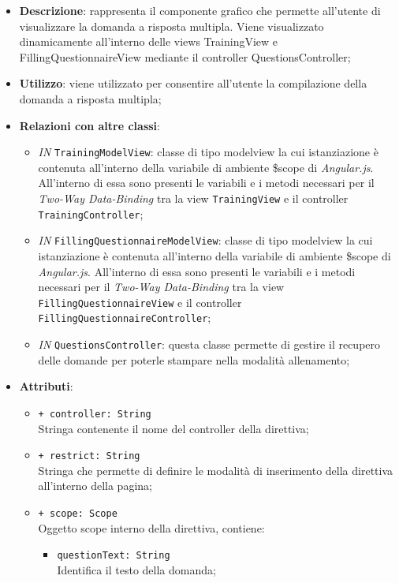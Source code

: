 		\begin{itemize}
			\item \textbf{Descrizione}: rappresenta il componente grafico che permette all'utente di visualizzare la domanda a risposta multipla. Viene visualizzato dinamicamente all'interno delle views TrainingView e FillingQuestionnaireView mediante il controller QuestionsController;
			\item \textbf{Utilizzo}: viene utilizzato per consentire all'utente la compilazione della domanda a risposta multipla;
			\item \textbf{Relazioni con altre classi}: 
			\begin{itemize}
				\item \textit{IN} \texttt{TrainingModelView}: classe di tipo modelview la cui istanziazione è contenuta all'interno della variabile di ambiente \$scope di \textit{Angular.js}. All'interno di essa sono presenti le variabili e i metodi necessari per il \textit{Two-Way Data-Binding} tra la view \texttt{TrainingView} e il controller \texttt{TrainingController}; 
				\item \textit{IN} \texttt{FillingQuestionnaireModelView}: classe di tipo modelview la cui istanziazione è contenuta all'interno della variabile di ambiente \$scope di \textit{Angular.js}. All'interno di essa sono presenti le variabili e i metodi necessari per il \textit{Two-Way Data-Binding} tra la view \texttt{FillingQuestionnaireView} e il controller \texttt{FillingQuestionnaireController};
				\item \textit{IN} \texttt{QuestionsController}: questa classe permette di gestire il recupero delle domande per poterle stampare nella modalità allenamento;
			\end{itemize}
			\item \textbf{Attributi}: 
			\begin{itemize}
				\item \texttt{+ controller: String} \\ Stringa contenente il nome del controller della direttiva;
				\item \texttt{+ restrict: String} \\ Stringa che permette di definire le modalità di inserimento della direttiva all'interno della pagina;
				\item \texttt{+ scope: Scope} \\ Oggetto scope interno della direttiva, contiene:
				\begin{itemize}
					\item \texttt{questionText: String} \\ Identifica il testo della domanda;

\end{itemize}
\end{itemize}
\end{itemize}
